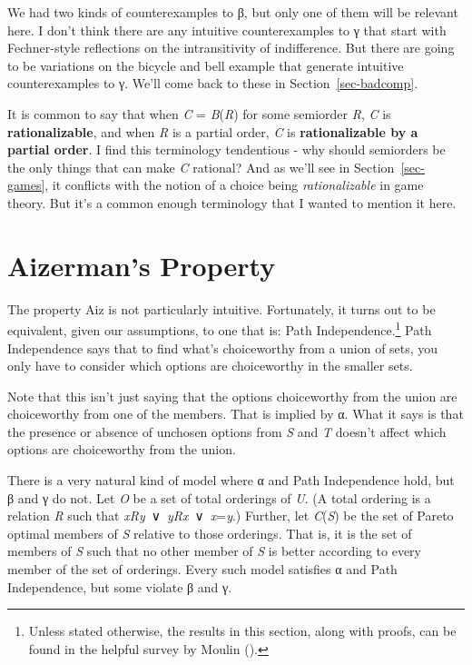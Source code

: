 \documentclass[
  11pt,
  letterpaper,
  DIV=11,
  numbers=noendperiod,
  twoside]{scrartcl}
\begin{document}
We had two kinds of counterexamples to β, but only one of them will be
relevant here. I don't think there are any intuitive counterexamples to
γ that start with Fechner-style reflections on the intransitivity of
indifference. But there are going to be variations on the bicycle and
bell example that generate intuitive counterexamples to γ. We'll come
back to these in Section~\ref{sec-badcomp}.

It is common to say that when \emph{C} = \emph{B}(\emph{R}) for some
semiorder \emph{R}, \emph{C} is \textbf{rationalizable}, and when
\emph{R} is a partial order, \emph{C} is \textbf{rationalizable by a
partial order}. I find this terminology tendentious - why should
semiorders be the only things that can make \emph{C} rational? And as
we'll see in Section~\ref{sec-games}, it conflicts with the notion of a
choice being \emph{rationalizable} in game theory. But it's a common
enough terminology that I wanted to mention it here.

\section{Aizerman's Property}\label{sec-aiz}

The property Aiz is not particularly intuitive. Fortunately, it turns
out to be equivalent, given our assumptions, to one that is: Path
Independence.\footnote{Unless stated otherwise, the results in this
  section, along with proofs, can be found in the helpful survey by
  Moulin ().} Path Independence says that
to find what's choiceworthy from a union of sets, you only have to
consider which options are choiceworthy in the smaller sets.

Note that this isn't just saying that the options choiceworthy from the
union are choiceworthy from one of the members. That is implied by α.
What it says is that the presence or absence of unchosen options from
\emph{S} and \emph{T} doesn't affect which options are choiceworthy from
the union.

There is a very natural kind of model where α and Path Independence
hold, but β and γ do not. Let \emph{O} be a set of total orderings of
\emph{U}. (A total ordering is a relation \emph{R} such that
\emph{xRy}~∨~\emph{yRx}~∨~\emph{x}=\emph{y}.) Further, let
\emph{C}(\emph{S}) be the set of Pareto optimal members of \emph{S}
relative to those orderings. That is, it is the set of members of
\emph{S} such that no other member of \emph{S} is better according to
every member of the set of orderings. Every such model satisfies α and
Path Independence, but some violate β and γ.
\end{document}
